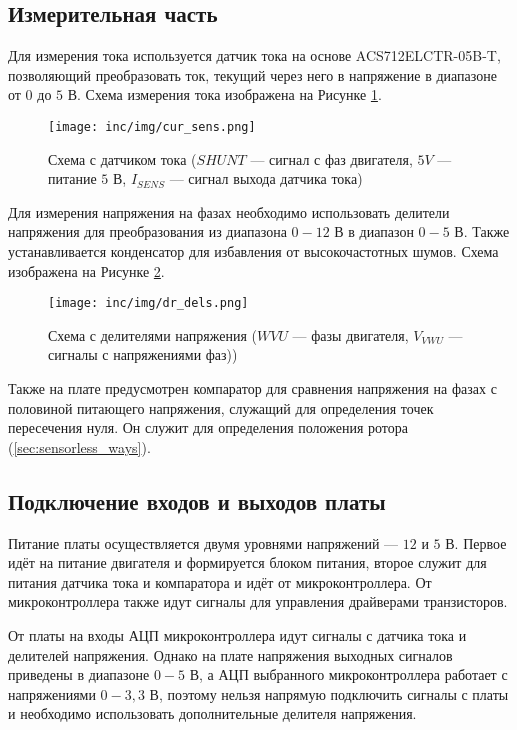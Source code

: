 \subsection{Измерительная часть}
\label{sec:meas_part}

Для измерения тока используется датчик тока на основе ACS712ELCTR-05B-T, позволяющий преобразовать ток, текущий через него в напряжение в диапазоне от $0$ до $5$ В. Схема измерения тока изображена на Рисунке \ref{pic:cur_sens}.

\begin{figure}[!h]
\centering
\texttt{[image: inc/img/cur\_sens.png]}
\caption{Схема с датчиком тока ($SHUNT$ --- сигнал с фаз двигателя, $5V$ --- питание $5$ В, $I_{SENS}$ --- сигнал выхода датчика тока)}
\label{pic:cur_sens}
\end{figure}

Для измерения напряжения на фазах необходимо использовать делители напряжения для преобразования из диапазона $0-12$ В в диапазон $0-5$ В. Также устанавливается конденсатор для избавления от высокочастотных шумов. Схема изображена на Рисунке \ref{pic:dr_dels}.

\begin{figure}[!h]
\centering
\texttt{[image: inc/img/dr\_dels.png]}
\caption{Схема с делителями напряжения ($WVU$ --- фазы двигателя, $V_{VWU}$ --- сигналы с напряжениями фаз))}
\label{pic:dr_dels}
\end{figure}

Также на плате предусмотрен компаратор для сравнения напряжения на фазах с половиной питающего напряжения\cite{habr:bldc_control}, служащий для определения точек пересечения нуля. Он служит для определения положения ротора (\ref{sec:sensorless_ways}).
\clearpage
\subsection{Подключение входов и выходов платы}

Питание платы осуществляется двумя уровнями напряжений --- $12$ и $5$ В. Первое идёт на питание двигателя и формируется блоком питания, второе служит для питания датчика тока и компаратора и идёт от микроконтроллера. От микроконтроллера также идут сигналы для управления драйверами транзисторов.

От платы на входы АЦП микроконтроллера идут сигналы с датчика тока и делителей напряжения. Однако на плате напряжения выходных сигналов приведены в диапазоне $0-5$ В, а АЦП выбранного микроконтроллера работает с напряжениями $0-3,3$ В, поэтому нельзя напрямую подключить сигналы с платы и необходимо использовать дополнительные делителя напряжения.

